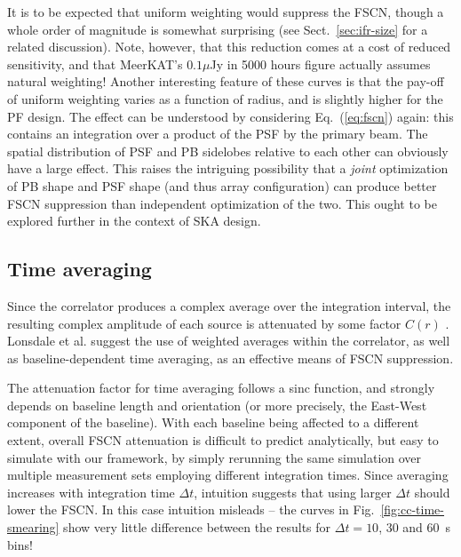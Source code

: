 \documentclass{aa}
\begin{document}
It is to be expected that uniform weighting would suppress the FSCN, though a whole order of magnitude is somewhat surprising (see Sect.~\ref{sec:ifr-size} for a related discussion). Note, however, that this reduction comes at a cost of reduced sensitivity, and that MeerKAT's $0.1\mu$Jy in 5000 hours figure actually assumes natural weighting! Another interesting feature of these curves is that the pay-off of uniform weighting varies as a function of radius, and is slightly higher for the PF design. The effect can be understood by considering  Eq.~(\ref{eq:fscn}) again: this contains an integration over a product of the PSF by the primary beam. The spatial distribution of PSF and PB sidelobes relative to each other can obviously have a large effect. This raises the intriguing possibility that a \emph{joint} optimization of PB shape and PSF shape (and thus array configuration) can produce better FSCN suppression than independent optimization of the two. This ought to be explored further in the context of SKA design.

\subsection{Time averaging}
\label{sec:smearing}

Since the correlator produces a complex average over the integration interval, the resulting complex amplitude of each source is attenuated by some factor $C(r)$ \citep[see Eq.~(\ref{eq:fscn}) above, and also Fig.~2 of][]{SKA54-expa,SKA54}. Lonsdale et al. suggest the use of weighted averages within the correlator, as well as baseline-dependent time averaging, as an effective means of FSCN suppression.

The attenuation factor for time averaging follows a sinc function, and strongly depends on baseline length and orientation (or more precisely, the East-West component of the baseline). With each baseline being affected to a different extent, overall FSCN attenuation is difficult to predict analytically, but easy to simulate with our framework, by simply rerunning the same simulation over multiple measurement sets employing different integration times. Since averaging increases with integration time $\Delta t$, intuition suggests that using larger $\Delta t$ should lower the FSCN. In this case intuition misleads -- the curves in Fig.~\ref{fig:cc-time-smearing} show very little difference between the results for $\Delta t=10$, 30 and 60~s bins!
\end{document}
